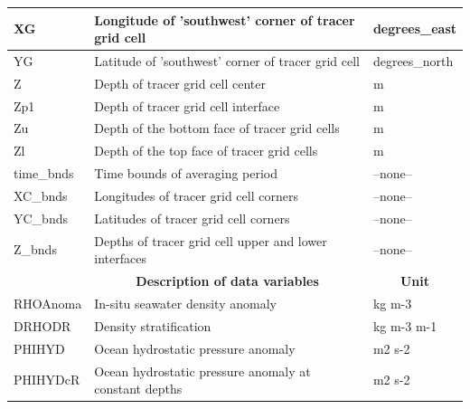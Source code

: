 \begin{longtable}{|m{}|m{}|m{}|}
XG &Longitude of 'southwest' corner of tracer grid cell &degrees\_east  \\ \hline
YG &Latitude of 'southwest' corner of tracer grid cell &degrees\_north  \\ \hline
Z &Depth of tracer grid cell center &m  \\ \hline
Zp1 &Depth of tracer grid cell interface &m  \\ \hline
Zu &Depth of the bottom face of tracer grid cells &m  \\ \hline
Zl &Depth of the top face of tracer grid cells &m  \\ \hline
time\_bnds &Time bounds of averaging period &--none--  \\ \hline
XC\_bnds &Longitudes of tracer grid cell corners &--none--  \\ \hline
YC\_bnds &Latitudes of tracer grid cell corners &--none--  \\ \hline
Z\_bnds &Depths of tracer grid cell upper and lower interfaces &--none--  \\ \hline
\rowcolor{lightgray} \multicolumn{1}{|c|}{\textbf{Variables}} & \multicolumn{1}{|c|}{\textbf{Description of data variables}} &  \multicolumn{1}{|c|}{\textbf{Unit}}\\ \hline
RHOAnoma &In-situ seawater density anomaly &kg m-3  \\ \hline
DRHODR &Density stratification &kg m-3 m-1  \\ \hline
PHIHYD &Ocean hydrostatic pressure anomaly &m2 s-2  \\ \hline
PHIHYDcR &Ocean hydrostatic pressure anomaly at constant depths &m2 s-2  \\ \hline
\end{longtable}

\newp
\pagebreak
